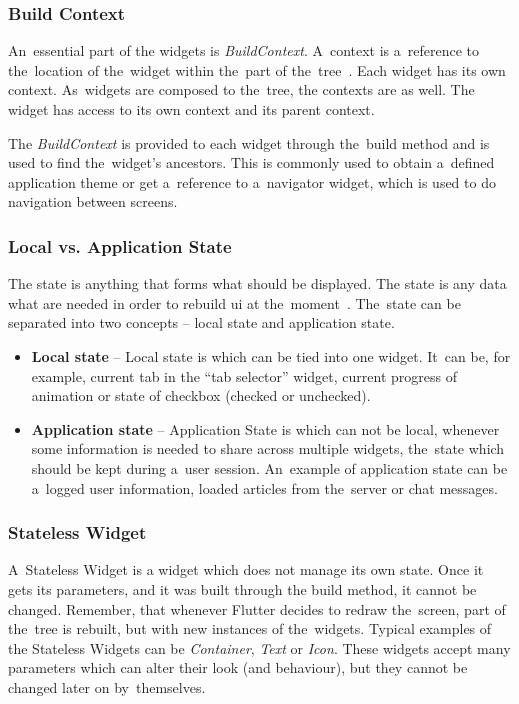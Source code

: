 \subsubsection{Build Context}
An~essential part of the widgets is \textit{BuildContext}. A~context is a~reference to the~location of the~widget within the~part of the~tree~\cite{notion-widget-didier}. Each widget has its own context. As~widgets are composed to the~tree, the contexts are as well. The widget has access to its own context and its parent context. 

The \textit{BuildContext} is provided to each widget through the~build method and is used to find the~widget's ancestors.  This is commonly used to obtain a~defined application theme or get a~reference to a~navigator widget, which is used to do navigation between screens. 
\subsubsection{Local vs. Application State}
The state is anything that forms what should be displayed. The state is any data what are needed in order to rebuild \gls{ui} at the~moment~\cite{flutter-local-app-state}. The~state can be separated into two concepts -- local state and application state. 

\begin{itemize}
    \item \textbf{Local state} -- Local state is which can be tied into one widget. It~can be, for example, current tab in the ``tab selector'' widget, current progress of animation or state of checkbox (checked or unchecked).
    \item \textbf{Application state} -- Application State is which can not be local, whenever some information is needed to share across multiple widgets, the~state which should be kept during a~user session. An~example of application state can be a~logged user information, loaded articles from the~server or chat messages.
\end{itemize}
\subsubsection{Stateless Widget}
A~Stateless Widget is a widget which does not manage its own state. Once it gets its parameters, and it was built through the build method, it cannot be changed. Remember, that whenever Flutter decides to redraw the~screen, part of the~tree is rebuilt, but with new instances of the~widgets. Typical examples of the Stateless Widgets can be \textit{Container}, \textit{Text} or \textit{Icon}. These widgets accept many parameters which can alter their look (and behaviour), but they cannot be changed later on by~themselves. 
